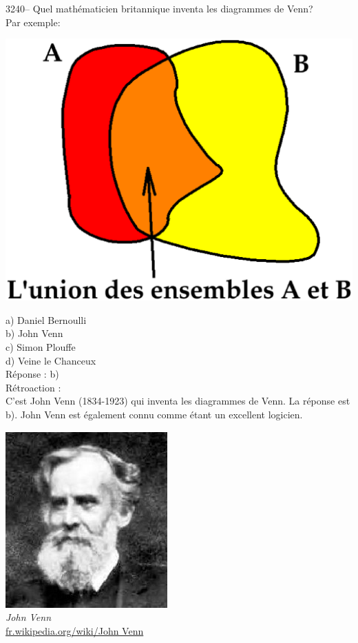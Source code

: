 \documentclass[letterpaper, 12pt]{article}
\begin{document}
3240-- Quel math\'ematicien britannique inventa les diagrammes de Venn?\\
Par exemple:
\begin{center}
\includegraphics[scale=0.25]{diagrammeVenn.eps}\\[5mm]
\end{center}

a) Daniel Bernoulli\\
b) John Venn\\
c) Simon Plouffe\\
d) Veine le Chanceux\\

R\'eponse : b)\\

R\'etroaction :\\
C'est John Venn (1834-1923) qui inventa les diagrammes de Venn. La r\'eponse est b). John Venn est \'egalement connu comme \'etant un excellent logicien.
\begin{center}
\includegraphics[scale=1.2]{Venn.eps}\\
\emph{{\small John Venn}}\\
\href{http://fr.wikipedia.org/wiki/John_Venn}{fr.wikipedia.org/wiki/John Venn}\\[5mm]
\end{center}
\end{document}
